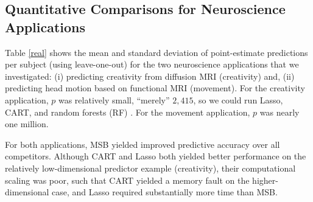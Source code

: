 \documentclass{article} %
\begin{document}
 



\subsection{Quantitative Comparisons for Neuroscience Applications} \label{sub:real}



Table \ref{real} shows the mean and standard deviation of point-estimate predictions per subject (using leave-one-out) for the two neuroscience applications that we investigated: (i) predicting creativity from diffusion MRI (creativity) and, (ii) predicting head motion based on functional MRI (movement).  For the creativity application, $p$ was relatively small, ``merely'' $2,415$, so we could run Lasso, CART, and random forests (RF) \cite{Brieman2001}.  For the movement application, $p$ was nearly one million. 

For both applications, MSB yielded improved predictive accuracy over all competitors.  Although CART and Lasso both yielded better performance on the relatively low-dimensional predictor example (creativity), their computational scaling was poor, such that CART yielded a memory fault on the higher-dimensional case, and Lasso required substantially more time than MSB.  
\end{document}
